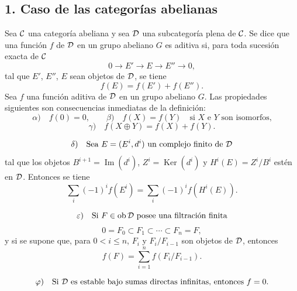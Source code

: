 \subsection*{1. Caso de las categorías abelianas}

Sea $\mathcal C$ una categoría abeliana y sea $\mathcal D$ una subcategoría plena de $\mathcal C$. Se dice que una función $f$ de $\mathcal D$ en un grupo abeliano $G$ es aditiva si, para toda sucesión exacta de $\mathcal C$
\[
0\longrightarrow E'\longrightarrow E\longrightarrow E''\longrightarrow 0,
\]
tal que $E'$, $E''$, $E$ sean objetos de $\mathcal D$, se tiene
\[
f(E)=f(E')+f(E'').
\]
Sea $f$ una función aditiva de $\mathcal D$ en un grupo abeliano $G$. Las propiedades siguientes son consecuencias inmediatas de la definición:
\[
\alpha)\quad f(0)=0,\qquad
\beta)\quad f(X)=f(Y)\quad\text{si }X\text{ e }Y\text{ son isomorfos,}
\]
\[
\gamma)\quad f(X\oplus Y)=f(X)+f(Y).
\]

\[
\delta)\quad
\text{Sea }E=(E^i,d^i)\text{ un complejo finito de }\mathcal D
\]
tal que los objetos $B^{i+1}=\operatorname{Im}(d^i)$, $Z^i=\operatorname{Ker}(d^i)$ y $H^i(E)=Z^i/B^i$ estén en $\mathcal D$. Entonces se tiene
\[
\sum_i (-1)^i f(E^i)=\sum_i (-1)^i f(H^i(E)).
\]

\[
\varepsilon)\quad
\text{Si }F\in\operatorname{ob} \mathcal D\text{ posee una filtración finita}
\]
\[
0=F_0\subset F_1\subset\cdots\subset F_n=F,
\]
y si se supone que, para $0<i\le n$, $F_i$ y $F_i/F_{i-1}$ son objetos de $\mathcal D$, entonces
\[
f(F)=\sum_{i=1}^n f(F_i/F_{i-1}).
\]

\[
\varphi)\quad
\text{Si }\mathcal D\text{ es estable bajo sumas directas infinitas, entonces }f=0.
\]
